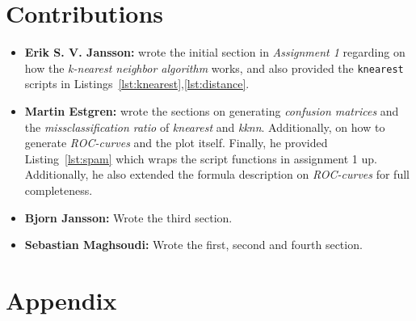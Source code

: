 \documentclass[a4paper, twocolumn]{article}
\begin{document}
    \section*{Contributions}

    \begin{itemize}
        \item{\textbf{Erik S. V. Jansson:} wrote the initial section in \emph{Assignment 1} regarding on how the \emph{k-nearest neighbor algorithm} works, and also provided the \texttt{knearest} scripts in Listings~\ref{lst:knearest},\ref{lst:distance}.}
        \item{\textbf{Martin Estgren:} wrote the sections on generating \emph{confusion matrices} and the \emph{missclassification ratio} of \emph{knearest} and \emph{kknn}. Additionally, on how to generate \emph{ROC-curves} and the plot itself. Finally, he provided Listing~\ref{lst:spam} which wraps the script functions in assignment 1 up. Additionally, he also extended the formula description on \emph{ROC-curves} for full completeness.}
        \item{\textbf{Bjorn Jansson:} Wrote the third section.}
        \item{\textbf{Sebastian Maghsoudi:} Wrote the first, second and fourth section.}
    \end{itemize}

    \nocite{*} %
    
    
    \onecolumn \appendix
    \section*{Appendix}

    
    
    
\end{document}
